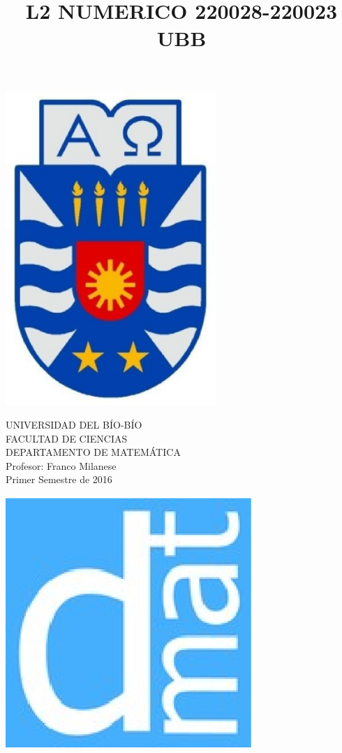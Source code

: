 \documentclass[11pt]{article}
\begin{document}
\title{L2 NUMERICO 220028-220023 UBB}

{\begin{minipage}{2cm}
\hspace*{1cm}\includegraphics[width=0.6\textwidth]{escubo-ubb.eps}
\end{minipage}
\begin{minipage}{12cm}
\small
{\bf \rm 
{
\begin{center}
{\footnotesize UNIVERSIDAD DEL B\'IO-B\'IO} \\
{\scriptsize FACULTAD DE CIENCIAS}  \\
{\scriptsize DEPARTAMENTO DE MATEM\'ATICA}  \\
{\scriptsize Profesor:  Franco Milanese}\\
{\scriptsize Primer Semestre de 2016}
\end{center}
}}
\end{minipage}}
{\begin{minipage}{2cm}
\hspace*{-0.5cm}\vspace*{-0.05cm}\includegraphics[width=0.7\textwidth]{escudo-dmat.eps}
\end{minipage}}
\end{document}
